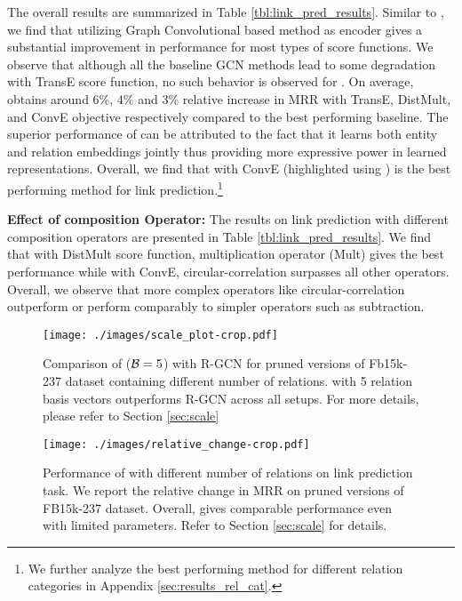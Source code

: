 \documentclass{article} \usepackage{iclr2020_conference,times}
\begin{document}
The overall results are summarized in Table \ref{tbl:link_pred_results}. Similar to \citet{r_gcn}, we find that utilizing Graph Convolutional based method as encoder gives a substantial improvement in performance for most types of score functions. We observe that although all the baseline GCN methods lead to some degradation with TransE score function, no such behavior is observed for \method{}. On average, \method{} obtains around $6$\%, $4$\% and $3$\% relative increase in MRR with TransE, DistMult, and ConvE objective respectively compared to the best performing baseline. The superior performance of \method{} can be attributed to the fact that it learns both entity and relation embeddings jointly thus providing more expressive power in learned representations. Overall, we find that \method{} with ConvE (highlighted using \boxed{\cdot}) is the best performing method for link prediction.\footnote{We further analyze the best performing method for different relation categories in Appendix \ref{sec:results_rel_cat}.}

\noindent \textbf{Effect of composition Operator:} 
The results on link prediction with different composition operators are presented in Table \ref{tbl:link_pred_results}. 
We find that with DistMult score function, multiplication operator (Mult) gives the best performance while with ConvE, circular-correlation surpasses all other operators. Overall, we observe that more complex operators like circular-correlation outperform or perform comparably to simpler operators such as subtraction. 

\label{sec:scale}
\begin{figure*}[t]
	\centering
	\begin{minipage}{.485\textwidth}
		\centering
		\texttt{[image: ./images/scale\_plot-crop.pdf]}
		\caption{\label{fig:rgcn_compare} \small Comparison of \method{} ($\mathcal{B} = 5$) with R-GCN for pruned versions of Fb15k-237 dataset containing different number of relations. \method{} with 5 relation basis vectors outperforms R-GCN across all setups. For more details, please refer to Section \ref{sec:scale}}
	\end{minipage} \quad
	\begin{minipage}{0.47\textwidth}
		\centering
		\texttt{[image: ./images/relative\_change-crop.pdf]}
		\caption{\label{fig:scale_plot} \small Performance of \method{} with different number of relations on link prediction task. We report the relative change in MRR on pruned versions of FB15k-237 dataset. Overall, \method{} gives comparable performance even with limited parameters. Refer to Section \ref{sec:scale} for details.}
	\end{minipage} \vspace{-4mm}
\end{figure*}
\end{document}
